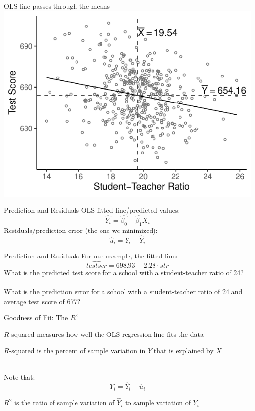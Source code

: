 \documentclass{./../div_teaching_slides}
\begin{document}
\begin{frame}{OLS line passes through the means}
\centering
\includegraphics{./../../output/lrm_caschool_means.pdf}
\end{frame}

\begin{frame}{Prediction and Residuals}
\vfill
OLS fitted line/predicted values:
$$ \hat{Y_i} = \hat{\beta_0} + \hat{\beta_1} X_i $$
Residuals/prediction error (the one we minimized):
$$ \hat{u}_i = Y_i-\hat{Y}_i $$  
\vfill
\end{frame}

\begin{frame}{Prediction and Residuals}
\vfill
For our example, the fitted line:
$$ \hat{testscr} = 698.93 -2.28 \cdot str $$
What is the predicted test score for a school with a student-teacher ratio of 24? \\~\\
What is the prediction error for a school with a student-teacher ratio of 24 and average test score of 677?
\vfill
\end{frame}

\begin{frame}{Goodness of Fit: The $R^2$}
\begin{witemize}
  \item $R$-squared measures how well the OLS regression line fits the data
  \item $R$-squared is the percent of sample variation in $Y$ that is explained by $X$ \\~\\
\end{witemize}
Note that:
$$ Y_i = \hat{Y}_i +  \hat{u}_i $$

\vspace{0.5em}
$R^2$ is the ratio of sample variation of $\hat{Y}_i$ to sample variation of $Y_i$
\end{frame}
\end{document}
